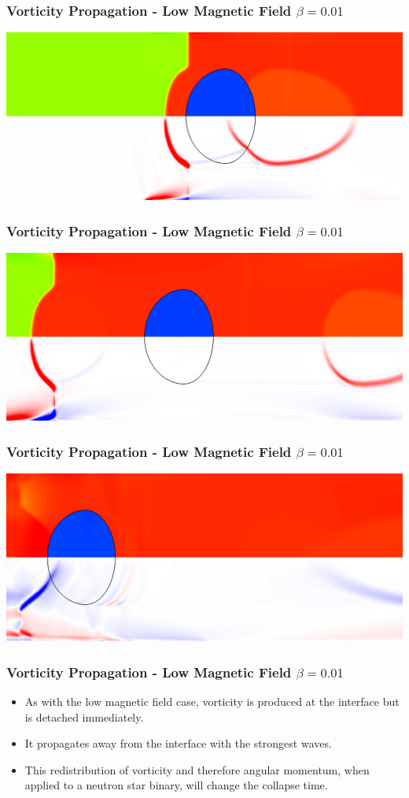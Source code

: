 \documentclass{beamer}
\begin{document}
\begin{frame}
\frametitle{Vorticity Propagation - Low Magnetic Field $\beta = 0.01$}
\includegraphics[width=\textwidth]{../images/SRMHDBubbleBeta001_t31_crop.png}
\end{frame}

\begin{frame}
\frametitle{Vorticity Propagation - Low Magnetic Field $\beta = 0.01$}
\includegraphics[width=\textwidth]{../images/SRMHDBubbleBeta001_t59_crop.png}
\end{frame}

\begin{frame}
\frametitle{Vorticity Propagation - Low Magnetic Field $\beta = 0.01$}
\includegraphics[width=\textwidth]{../images/SRMHDBubbleBeta001_t125_crop.png}
\end{frame}
\begin{frame}
\frametitle{Vorticity Propagation - Low Magnetic Field $\beta = 0.01$}
\begin{itemize}
\item{As with the low magnetic field case, vorticity is produced at the interface but is detached immediately.}
\item{It propagates away from the interface with the strongest waves.}
\item{This redistribution of vorticity and therefore angular momentum, when applied to a neutron star binary, will change the collapse time.}
\end{itemize}
\end{frame}
\end{document}
